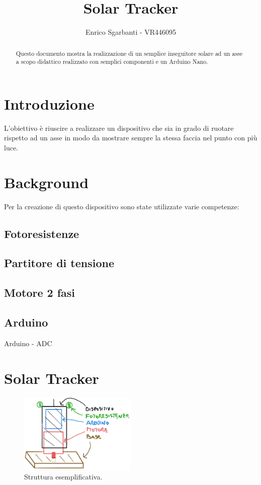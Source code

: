 \documentclass[12pt,oneside,a4paper]{article}
\title{\textbf{Solar Tracker}}
\author{Enrico Sgarbanti - VR446095}
\begin{document}
\maketitle


\begin{abstract}
    Questo documento mostra la realizzazione di un semplice inseguitore solare ad un asse a scopo didattico realizzato con semplici componenti e un Arduino Nano.
\end{abstract}


\section{Introduzione}
L'obiettivo è riuscire a realizzare un dispositivo che sia in grado di ruotare rispetto ad un asse in modo da mostrare sempre la stessa faccia nel punto con più luce.

\section{Background}
Per la creazione di questo dispositivo sono state utilizzate varie competenze:

\subsection{Fotoresistenze}

\subsection{Partitore di tensione}

\subsection{Motore 2 fasi}

\subsection{Arduino}
Arduino\cite{Arduino}
- ADC

\section{Solar Tracker}
\begin{figure}[ht]
    \centering
    \includegraphics[width=0.5\textwidth]{figures/modello_solar_tracker}
    \caption{Struttura esemplificativa.}
\end{figure}
\end{document}
